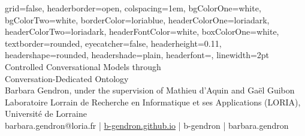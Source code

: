 \documentclass[a0paper,portrait]{baposter}
\begin{document}

\begin{poster}
{
grid=false,
headerborder=open, %
colspacing=1em, %
bgColorOne=white, %
bgColorTwo=white, %
borderColor=loriablue, %
headerColorOne=loriadark, %
headerColorTwo=loriadark, %
headerFontColor=white, %
boxColorOne=white, %
textborder=rounded, %
eyecatcher=false, %
headerheight=0.11\textheight, %
headershape=rounded, %
headershade=plain,
headerfont=\Large\textsf, %
linewidth=2pt %
}
{}
%
%
{\textsf{Controlled Conversational Models through \\ Conversation-Dedicated Ontology}}
{\sf\vspace{0.3em}\\
Barbara Gendron, under the supervision of Mathieu d'Aquin and Gaël Guibon
\vspace{0.1em}\\
\small{Laboratoire Lorrain de Recherche en Informatique et ses Applications (LORIA), Université de Lorraine
\vspace{0.2em}\\
\faEnvelopeO \enspace barbara.gendron@loria.fr | \faDesktop \enspace \url{b-gendron.github.io} | \faGithub \enspace b-gendron | \faLinkedin \enspace barbara.gendron
}}
{
}%


\end{poster}
\end{document}
